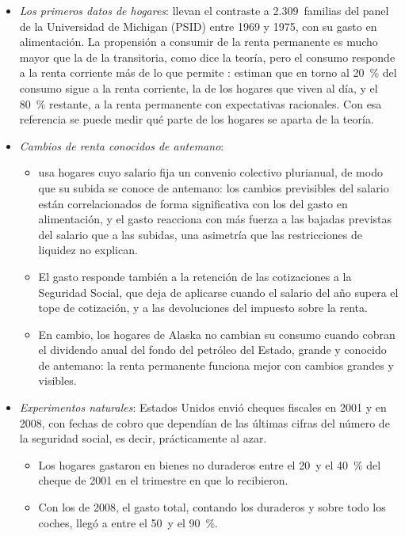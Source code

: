\documentclass[11pt]{article}
\begin{document}
\begin{itemize}
\item \emph{Los primeros datos de hogares}: \textcite{HallMishkin1982Sensitivity} llevan el contraste a 2.309~familias del panel de la Universidad de Michigan (PSID) entre 1969 y 1975, con su gasto en alimentación. La propensión a consumir de la renta permanente es mucho mayor que la de la transitoria, como dice la teoría, pero el consumo responde a la renta corriente más de lo que permite : estiman que en torno al 20~\% del consumo sigue a la renta corriente, la de los hogares que viven al día, y el 80~\% restante, a la renta permanente con expectativas racionales\nocite{Nobel2026Cientifico}. Con esa referencia se puede medir qué parte de los hogares se aparta de la teoría.
\item \emph{Cambios de renta conocidos de antemano}:
  \begin{itemize}
  \item \textcite{Shea1995Union} usa hogares cuyo salario fija un convenio colectivo plurianual, de modo que su subida se conoce de antemano: los cambios previsibles del salario están correlacionados de forma significativa con los del gasto en alimentación, y el gasto reacciona con más fuerza a las bajadas previstas del salario que a las subidas, una asimetría que las restricciones de liquidez no explican.
  \item El gasto responde también a la retención de las cotizaciones a la Seguridad Social, que deja de aplicarse cuando el salario del año supera el tope de cotización\nocite{Parker1999Reaction}, y a las devoluciones del impuesto sobre la renta\nocite{Souleles1999Response}.
  \item En cambio, los hogares de Alaska no cambian su consumo cuando cobran el dividendo anual del fondo del petróleo del Estado, grande y conocido de antemano\nocite{Hsieh2003Alaska}: la renta permanente funciona mejor con cambios grandes y visibles.
  \end{itemize}
\item \emph{Experimentos naturales}: Estados Unidos envió cheques fiscales en 2001 y en 2008, con fechas de cobro que dependían de las últimas cifras del número de la seguridad social, es decir, prácticamente al azar.
  \begin{itemize}
  \item Los hogares gastaron en bienes no duraderos entre el 20~y el 40~\% del cheque de 2001 en el trimestre en que lo recibieron\nocite{JohnsonParkerSouleles2006Household}.
  \item Con los de 2008, el gasto total, contando los duraderos y sobre todo los coches, llegó a entre el 50~y el 90~\%\nocite{ParkerEtAl2013Consumer}.

\end{itemize}
\end{itemize}
\end{document}
